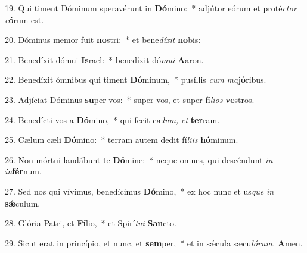 \item 19. Qui timent Dóminum speravérunt in \textbf{Dó}mino:~* adjútor eórum et proté\textit{ctor} \textit{e}\textbf{ó}rum est.
\item 20. Dóminus memor fuit \textbf{no}stri:~* et bene\textit{díxit} \textbf{no}bis:
\item 21. Benedíxit dómui \textbf{Is}rael:~* benedíxit dó\textit{mui} \textbf{A}aron.
\item 22. Benedíxit ómnibus qui timent \textbf{Dó}minum,~* pusíllis \textit{cum} \textit{ma}\textbf{jó}ribus.
\item 23. Adjíciat Dóminus \textbf{su}per vos:~* super vos, et super fí\textit{lios} \textbf{ve}stros.
\item 24. Benedícti vos a \textbf{Dó}mino,~* qui fecit cæ\textit{lum,} \textit{et} \textbf{ter}ram.
\item 25. Cælum cæli \textbf{Dó}mino:~* terram autem dedit fí\textit{liis} \textbf{hó}minum.
\item 26. Non mórtui laudábunt te \textbf{Dó}mine:~* neque omnes, qui descéndunt \textit{in} \textit{in}\textbf{fér}num.
\item 27. Sed nos qui vívimus, benedícimus \textbf{Dó}mino,~* ex hoc nunc et us\textit{que} \textit{in} \textbf{sǽ}culum.
\item 28. Glória Patri, et \textbf{Fí}lio,~* et Spirí\hspace{0.03em}\textit{tu}\textit{i} \textbf{San}cto.
\item 29. Sicut erat in princípio, et nunc, et \textbf{sem}per,~* et in sǽcula sæcu\hspace{0.03em}\textit{lórum.} \textbf{A}men.

